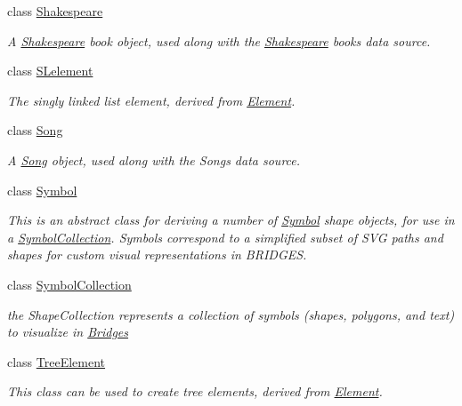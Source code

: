 \begin{DoxyCompactItemize}
class \mbox{\hyperlink{classbridges_1_1_shakespeare}{Shakespeare}}
\begin{DoxyCompactList}\small\item\em A \mbox{\hyperlink{classbridges_1_1_shakespeare}{Shakespeare}} book object, used along with the \mbox{\hyperlink{classbridges_1_1_shakespeare}{Shakespeare}} books data source. \end{DoxyCompactList}\item 
class \mbox{\hyperlink{classbridges_1_1_s_lelement}{S\+Lelement}}
\begin{DoxyCompactList}\small\item\em The singly linked list element, derived from \mbox{\hyperlink{classbridges_1_1_element}{Element}}. \end{DoxyCompactList}\item 
class \mbox{\hyperlink{classbridges_1_1_song}{Song}}
\begin{DoxyCompactList}\small\item\em A \mbox{\hyperlink{classbridges_1_1_song}{Song}} object, used along with the Songs data source. \end{DoxyCompactList}\item 
class \mbox{\hyperlink{classbridges_1_1_symbol}{Symbol}}
\begin{DoxyCompactList}\small\item\em This is an abstract class for deriving a number of \mbox{\hyperlink{classbridges_1_1_symbol}{Symbol}} shape objects, for use in a \mbox{\hyperlink{classbridges_1_1_symbol_collection}{Symbol\+Collection}}. Symbols correspond to a simplified subset of S\+VG paths and shapes for custom visual representations in B\+R\+I\+D\+G\+ES. \end{DoxyCompactList}\item 
class \mbox{\hyperlink{classbridges_1_1_symbol_collection}{Symbol\+Collection}}
\begin{DoxyCompactList}\small\item\em the Shape\+Collection represents a collection of symbols (shapes, polygons, and text) to visualize in \mbox{\hyperlink{classbridges_1_1_bridges}{Bridges}} \end{DoxyCompactList}\item 
class \mbox{\hyperlink{classbridges_1_1_tree_element}{Tree\+Element}}
\begin{DoxyCompactList}\small\item\em This class can be used to create tree elements, derived from \mbox{\hyperlink{classbridges_1_1_element}{Element}}. \end{DoxyCompactList}\end{DoxyCompactItemize}

